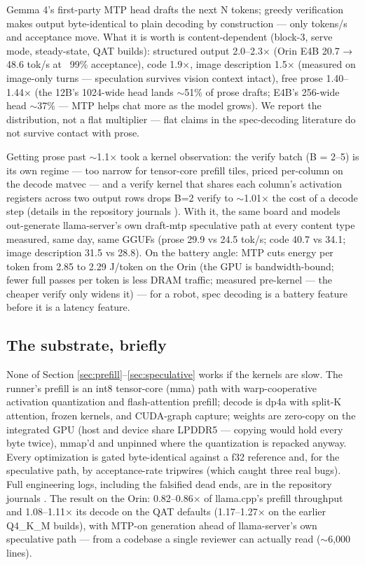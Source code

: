 \documentclass{article}
\begin{document}
Gemma 4's first-party MTP head drafts the next N tokens; greedy verification makes output byte-identical to plain decoding by construction — only tokens/s and acceptance move. What it is worth is content-dependent (block-3, serve mode, steady-state, QAT builds): structured output 2.0–2.3× (Orin E4B 20.7 → 48.6 tok/s at ~99\% acceptance), code 1.9×, image description 1.5× (measured on image-only turns — speculation survives vision context intact), free prose 1.40–1.44× (the 12B's 1024-wide head lands $\sim$51\% of prose drafts; E4B's 256-wide head $\sim$37\% — MTP helps chat more as the model grows). We report the distribution, not a flat multiplier — flat claims in the spec-decoding literature do not survive contact with prose.

Getting prose past $\sim$1.1× took a kernel observation: the verify batch (B = 2–5) is its own regime — too narrow for tensor-core prefill tiles, priced per-column on the decode matvec — and a verify kernel that shares each column's activation registers across two output rows drops B=2 verify to $\sim$1.01× the cost of a decode step (details in the repository journals \citep{littlegemma}). With it, the same board and models out-generate llama-server's own draft-mtp speculative path at every content type measured, same day, same GGUFs (prose 29.9 vs 24.5 tok/s; code 40.7 vs 34.1; image description 31.5 vs 28.8). On the battery angle: MTP cuts energy per token from 2.85 to 2.29 J/token on the Orin (the GPU is bandwidth-bound; fewer full passes per token is less DRAM traffic; measured pre-kernel — the cheaper verify only widens it) — for a robot, spec decoding is a battery feature before it is a latency feature.

\subsection{The substrate, briefly}

None of Section \ref{sec:prefill}–\ref{sec:speculative} works if the kernels are slow. The runner's prefill is an int8 tensor-core (mma) path with warp-cooperative activation quantization and flash-attention prefill; decode is dp4a with split-K attention, frozen kernels, and CUDA-graph capture; weights are zero-copy on the integrated GPU (host and device share LPDDR5 — copying would hold every byte twice), mmap'd and unpinned where the quantization is repacked anyway. Every optimization is gated byte-identical against a f32 reference and, for the speculative path, by acceptance-rate tripwires (which caught three real bugs). Full engineering logs, including the falsified dead ends, are in the repository journals \citep{littlegemma}. The result on the Orin: 0.82–0.86× of llama.cpp's prefill throughput and 1.08–1.11× its decode on the QAT defaults (1.17–1.27× on the earlier Q4\_K\_M builds), with MTP-on generation ahead of llama-server's own speculative path — from a codebase a single reviewer can actually read ($\sim$6,000 lines).
\end{document}
